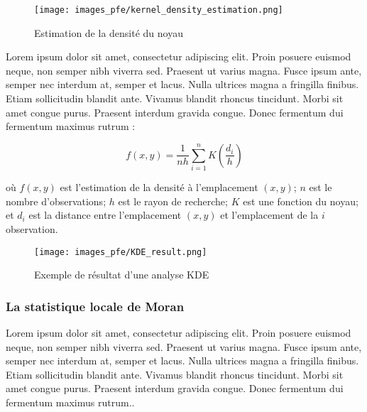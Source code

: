 \begin{figure}[hbt!]
  \centering
  \texttt{[image: images\_pfe/kernel\_density\_estimation.png]}
  \caption{Estimation de la densité du noyau \parencite{hart_kernel_2014}}
  \label{fig:kde}
\end{figure}
\FloatBarrier

\medskip

\medskip

Lorem ipsum dolor sit amet, consectetur adipiscing elit. Proin posuere euismod neque, non semper nibh viverra sed. Praesent ut varius magna. Fusce ipsum ante, semper nec interdum at, semper et lacus. Nulla ultrices magna a fringilla finibus. Etiam sollicitudin blandit ante. Vivamus blandit rhoncus tincidunt. Morbi sit amet congue purus. Praesent interdum gravida congue. Donec fermentum dui fermentum maximus rutrum \parencite{fotheringham_quantitative_2007} :

\medskip

\begin{equation}
  \displaystyle f(x,y) = \frac{1}{nh} \sum_{i=1}^{n} K (\frac{d_i}{h})
  \label{kernel-density-estimation}
\end{equation}

\medskip

où $f(x, y)$ est l'estimation de la densité à l'emplacement $(x, y)$; $n$ est le nombre d'observations; $h$ est le rayon de recherche; $K$ est une fonction du noyau; et $d_i$ est la distance entre l'emplacement $(x, y)$ et l'emplacement de la $i$ observation.

\medskip

\begin{figure}[hbt!]
  \centering
  \texttt{[image: images\_pfe/KDE\_result.png]}
  \caption{Exemple de résultat d'une analyse KDE \parencite{romano_visualizing_2017}}
  \label{fig:kde-result}
\end{figure}
\FloatBarrier

\medskip

\subsubsection{La statistique locale de Moran}
Lorem ipsum dolor sit amet, consectetur adipiscing elit. Proin posuere euismod neque, non semper nibh viverra sed. Praesent ut varius magna. Fusce ipsum ante, semper nec interdum at, semper et lacus. Nulla ultrices magna a fringilla finibus. Etiam sollicitudin blandit ante. Vivamus blandit rhoncus tincidunt. Morbi sit amet congue purus. Praesent interdum gravida congue. Donec fermentum dui fermentum maximus rutrum.\parencite{hart_kernel_2014}.

